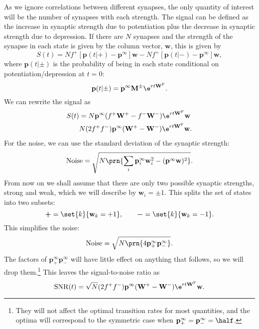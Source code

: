 \documentclass[12pt]{article}
\newcommand{\eq}{\mathbf{p}^\infty}
\newcommand{\w}{\mathbf{w}}
\newcommand{\W}{\mathbf{W}}
\newcommand{\M}{\mathbf{M}}
\newcommand{\frg}{\W^{\mathrm{F}}}
\DeclareMathOperator{\SNR}{SNR}
\begin{document}
As we ignore correlations between different synapses, the only quantity of interest will be the number of synapses with each strength.
The signal can be defined as the increase in synaptic strength due to potentiation plus the decrease in synaptic strength due to depression.
If there are $N$ synapses and the strength of the synapse in each state is given by the column vector, $\w$, this is given by
%
\begin{equation}\label{eq:signal}
  S(t) = N f^+ [\mathbf{p}(t|+)-\eq]\w - N f^+ [\mathbf{p}(t|-)-\eq]\w,
\end{equation}
%
where $\mathbf{p}(t|\pm)$ is the probability of being in each state conditional on potentiation/depression at $t=0$:
%
\begin{equation}\label{eq:initprob}
  \mathbf{p}(t|\pm) = \eq\M^\pm \e^{rt\frg}.
\end{equation}
%
We can rewrite the signal as
%
\begin{equation}\label{eq:signalr}
\begin{aligned}
  S(t) &= N \eq (f^+\W^+ - f^-\W^-)\e^{rt\frg}\w\\
    & N (2f^+f^-) \eq (\W^+ - \W^-)\e^{rt\frg}\w.
\end{aligned}
\end{equation}
%
For the noise, we can use the standard deviation of the synaptic strength:
%
\begin{equation}\label{eq:noise}
  \text{Noise} = \sqrt{N \prn{\sum_i \eq_i\w_i^2 - (\eq\w)^2}}.
\end{equation}
%
From now on we shall assume that there are only two possible synaptic strengths, strong and weak, which we will describe by $\w_i=\pm1$. This splits the set of states into two subsets:
%
\begin{equation}\label{eq:plusminusstates}
  \boldsymbol{+} = \set{k}{\w_k=+1},
  \qquad
  \boldsymbol{-} = \set{k}{\w_k=-1}.
\end{equation}
%
This simplifies the noise:
%
\begin{equation}\label{eq:noisepm}
  \text{Noise} = \sqrt{N \prn{4\eq_+\eq_-}}.
\end{equation}
%
The factors of $\eq_+\eq_-$ will have little effect on anything that follows, so we will drop them.\footnote{They will not affect the optimal transition rates for most quantities, and the optima will correspond to the symmetric case when $\eq_+=\eq_-=\half$.} This leaves the signal-to-noise ratio as
%
\begin{equation}\label{eq:SNRcurve}
  \SNR(t) = \sqrt{N} (2f^+f^-) \eq (\W^+ - \W^-)\e^{rt\frg}\w.
\end{equation}
%
\end{document}
